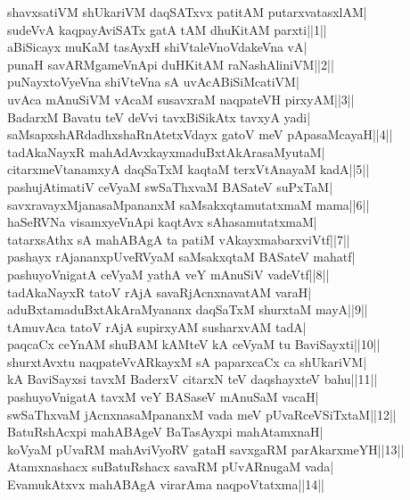 \documentclass{article}
\begin{document}
shavxsatiVM shUkariVM daqSATxvx patitAM putarxvatasxlAM|\\
sudeVvA kaqpayAviSATx gatA tAM dhuKitAM parxti||1||\\
aBiSicayx muKaM tasAyxH shiVtaleVnoVdakeVna vA|\\
punaH savARMgameVnApi duHKitAM raNashAliniVM||2||\\
puNayxtoVyeVna shiVteVna sA uvAcABiSiMcatiVM|\\
uvAca mAnuSiVM vAcaM susavxraM naqpateVH pirxyAM||3||\\
BadarxM Bavatu teV deVvi tavxBiSikAtx tavxyA yadi|\\
saMsapxshARdadhxshaRnAtetxVdayx gatoV meV pApasaMcayaH||4||\\
tadAkaNayxR mahAdAvxkayxmaduBxtAkArasaMyutaM|\\
citarxmeVtanamxyA daqSaTxM kaqtaM terxVtAnayaM kadA||5||\\
pashujAtimatiV ceVyaM swSaThxvaM BASateV suPxTaM|\\
savxravayxMjanasaMpananxM saMsakxqtamutatxmaM mama||6||\\
haSeRVNa visamxyeVnApi kaqtAvx sAhasamutatxmaM|\\
tatarxsAthx sA mahABAgA ta patiM vAkayxmabarxviVtf||7||\\
pashayx rAjananxpUveRVyaM saMsakxqtaM BASateV mahatf|\\
pashuyoVnigatA ceVyaM yathA veY mAnuSiV vadeVtf||8||\\
tadAkaNayxR tatoV rAjA savaRjAcnxnavatAM varaH|\\
aduBxtamaduBxtAkAraMyananx daqSaTxM shurxtaM mayA||9||\\
tAmuvAca tatoV rAjA supirxyAM susharxvAM tadA|\\
paqcaCx ceYnAM shuBAM kAMteV kA ceVyaM tu BaviSayxti||10||\\
shurxtAvxtu naqpateVvARkayxM sA paparxcaCx ca shUkariVM|\\
kA BaviSayxsi tavxM BaderxV citarxN teV daqshayxteV bahu||11||\\
pashuyoVnigatA tavxM veY BASaseV mAnuSaM vacaH|\\
swSaThxvaM jAcnxnasaMpananxM vada meV pUvaRceVSiTxtaM||12||\\
BatuRshAcxpi mahABAgeV BaTasAyxpi mahAtamxnaH|\\
koVyaM pUvaRM mahAviVyoRV gataH savxgaRM parAkarxmeYH||13||\\
Atamxnashacx suBatuRshacx savaRM pUvARnugaM vada|\\
EvamukAtxvx mahABAgA virarAma naqpoVtatxma||14||\\
\end{document}
